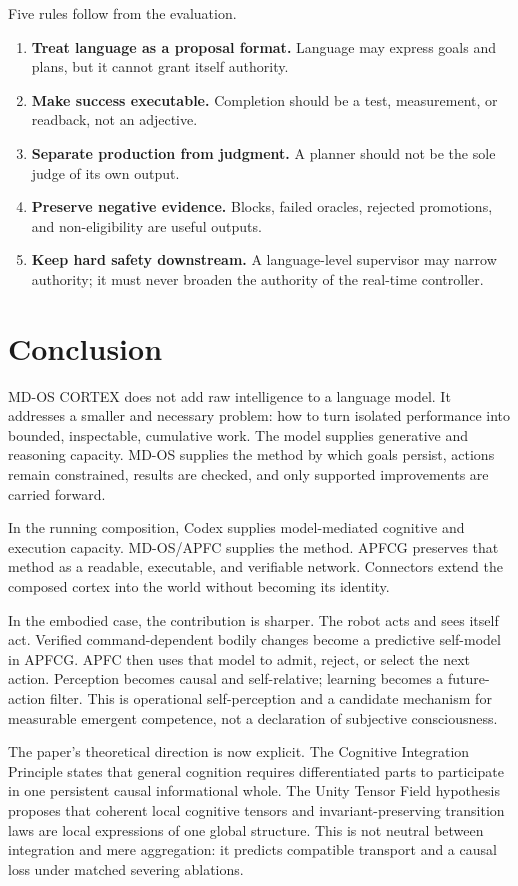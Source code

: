 \documentclass[10pt,twocolumn]{article}
\theoremstyle{definition}
\theoremstyle{plain}
\theoremstyle{remark}
\begin{document}
Five rules follow from the evaluation.

\begin{enumerate}
  \item \textbf{Treat language as a proposal format.}  Language may express goals and plans, but it cannot grant itself authority.
  \item \textbf{Make success executable.}  Completion should be a test, measurement, or readback, not an adjective.
  \item \textbf{Separate production from judgment.}  A planner should not be the sole judge of its own output.
  \item \textbf{Preserve negative evidence.}  Blocks, failed oracles, rejected promotions, and non-eligibility are useful outputs.
  \item \textbf{Keep hard safety downstream.}  A language-level supervisor may narrow authority; it must never broaden the authority of the real-time controller.
\end{enumerate}

\section{Conclusion}

MD-OS CORTEX does not add raw intelligence to a language model.  It addresses a smaller and necessary problem: how to turn isolated performance into bounded, inspectable, cumulative work.  The model supplies generative and reasoning capacity.  MD-OS supplies the method by which goals persist, actions remain constrained, results are checked, and only supported improvements are carried forward.

In the running composition, Codex supplies model-mediated cognitive and execution capacity.  MD-OS/APFC supplies the method.  APFCG preserves that method as a readable, executable, and verifiable network.  Connectors extend the composed cortex into the world without becoming its identity.

In the embodied case, the contribution is sharper.  The robot acts and sees itself act.  Verified command-dependent bodily changes become a predictive self-model in APFCG.  APFC then uses that model to admit, reject, or select the next action.  Perception becomes causal and self-relative; learning becomes a future-action filter.  This is operational self-perception and a candidate mechanism for measurable emergent competence, not a declaration of subjective consciousness.

The paper's theoretical direction is now explicit.  The Cognitive Integration Principle states that general cognition requires differentiated parts to participate in one persistent causal informational whole.  The Unity Tensor Field hypothesis proposes that coherent local cognitive tensors and invariant-preserving transition laws are local expressions of one global structure.  This is not neutral between integration and mere aggregation: it predicts compatible transport and a causal loss under matched severing ablations.
\end{document}
